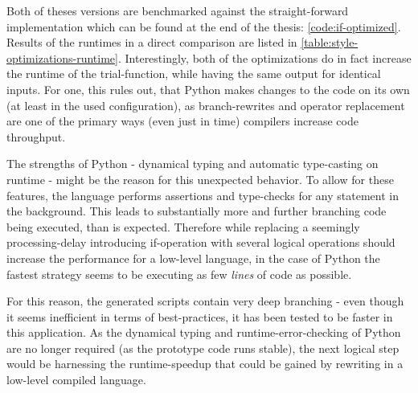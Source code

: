Both of theses versions are benchmarked against the straight-forward implementation which can be found at the end of the thesis: \ref{code:if-optimized}.
Results of the runtimes in a direct comparison are listed in \autoref{table:style-optimizations-runtime}.
Interestingly, both of the \glqq optimizations\grqq{} do in fact increase the runtime of the trial-function, while having the same output for identical inputs.
For one, this rules out, that Python makes changes to the code on its own (at least in the used configuration), as branch-rewrites and operator replacement are one of the primary ways (even just in time) compilers increase code throughput.

The strengths of Python - dynamical typing and automatic type-casting on runtime - might be the reason for this unexpected behavior.
To allow for these features, the language performs assertions and type-checks for any statement in the background.
This leads to substantially more and further branching code being executed, than is expected.
Therefore while replacing a seemingly processing-delay introducing if-operation with several logical operations should increase the performance for a low-level language, in the case of Python the fastest strategy seems to be executing as few \emph{lines} of code as possible.

For this reason, the generated scripts contain very deep branching - even though it seems inefficient in terms of best-practices, it has been tested to be faster in this application.
As the dynamical typing and runtime-error-checking of Python are no longer required (as the prototype code runs stable), the next logical step would be harnessing the runtime-speedup that could be gained by rewriting in a low-level compiled language.